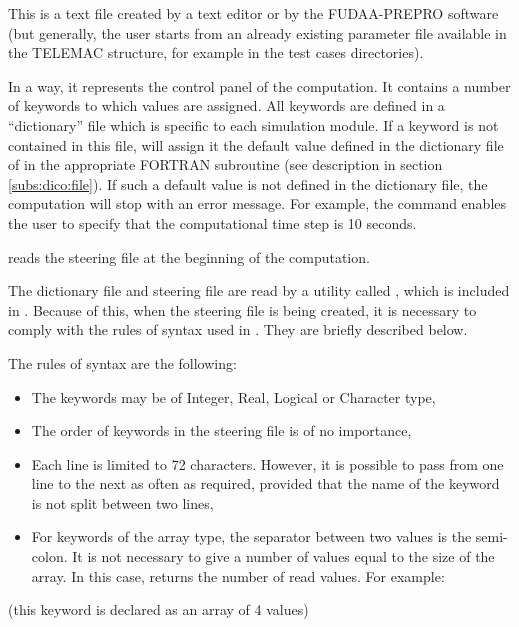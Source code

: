 This is a text file created by a text editor or by the FUDAA-PREPRO software
(but generally, the user starts from an already existing parameter file available
in the TELEMAC structure, for example in the test cases directories).

In a way, it represents the control panel of the computation.
It contains a number of keywords to which values are assigned.
All keywords are defined in a ``dictionary'' file which is specific to each
simulation module.
If a keyword is not contained in this file,  will assign it
the default value defined in the dictionary file of in the appropriate FORTRAN
subroutine (see description in section \ref{subs:dico:file}).
If such a default value is not defined in the dictionary file,
the computation will stop with an error message.
For example, the command  enables the user to specify
that the computational time step is 10 seconds.

 reads the steering file at the beginning of the computation.

The dictionary file and steering file are read by a utility called \damo,
which is included in \tel.
Because of this, when the steering file is being created, it is necessary
to comply with the rules of syntax used in \damo.
They are briefly described below.

The rules of syntax are the following:

\begin{itemize}
\item The keywords may be of Integer, Real, Logical or Character type,

\item The order of keywords in the steering file is of no importance,

\item Each line is limited to 72 characters.
However, it is possible to pass from one line to the next as often as required,
provided that the name of the keyword is not split between two lines,

\item For keywords of the array type, the separator between two values is the
semi-colon.
It is not necessary to give a number of values equal to the size of the array.
In this case, \damo returns the number of read values. For example:
\end{itemize}


 (this keyword is declared as an array of 4 values)

